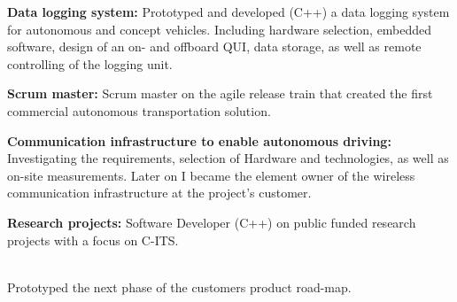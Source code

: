 \textbf{Data logging system:} Prototyped and developed (C++) a data logging system for autonomous and concept vehicles. Including hardware selection, embedded software, design of an on- and offboard QUI, data storage, as well as remote controlling of the logging unit. 
\SmallSep

\textbf{Scrum master:} Scrum master on the agile release train that created the first commercial autonomous transportation solution.
\SmallSep

\textbf{Communication infrastructure to enable autonomous driving:} Investigating the requirements, selection of Hardware and technologies, as well as on-site measurements. Later on I became the element owner of the wireless communication infrastructure at the project's customer.  
\SmallSep

\textbf{Research projects:} Software Developer (C++) on public funded research projects with a focus on C-ITS. \\
\Sep

 \\
Prototyped the next phase of the customers product road-map.
